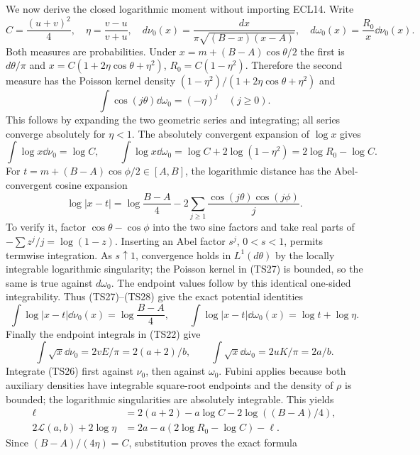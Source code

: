 We now derive the closed logarithmic moment without importing ECL14.
Write
\[
 C=\frac{(u+v)^2}{4},\quad\eta=\frac{v-u}{v+u},\quad
 d\nu_0(x)=\frac{dx}{\pi\sqrt{(B-x)(x-A)}},\quad
 d\omega_0(x)=\frac{R_0}{x}\dd\nu_0(x).
\]
Both measures are probabilities. Under $x=m+(B-A)\cos\theta/2$
the first is $d\theta/\pi$ and
$x=C(1+2\eta\cos\theta+\eta^2)$,
$R_0=C(1-\eta^2)$. Therefore the second measure has the Poisson
kernel density $(1-\eta^2)/(1+2\eta\cos\theta+\eta^2)$ and
\begin{equation}\tag{TS27}
 \int\cos(j\theta)\dd\omega_0=(-\eta)^j\quad(j\geq0).
\end{equation}
This follows by expanding the two geometric series and integrating;
all series converge absolutely for $\eta<1$.
The absolutely convergent expansion of $\log x$ gives
\begin{equation}\tag{TS28}
 \int\log x\dd\nu_0=\log C,\qquad
 \int\log x\dd\omega_0=\log C+2\log(1-\eta^2)
 =2\log R_0-\log C.
\end{equation}
For $t=m+(B-A)\cos\phi/2\in[A,B]$, the logarithmic distance has
the Abel-convergent cosine expansion
\[
 \log|x-t|=\log\frac{B-A}{4}
       -2\sum_{j\geq1}\frac{\cos(j\theta)\cos(j\phi)}j.
\]
To verify it, factor $\cos\theta-\cos\phi$ into the two sine
factors and take real parts of $-\sum z^j/j=\log(1-z)$.
Inserting an Abel factor $s^j$, $0<s<1$, permits termwise
integration. As $s\uparrow1$, convergence holds in $L^1(d\theta)$
by the locally integrable logarithmic singularity; the Poisson
kernel in (TS27) is bounded, so the same is true against $d\omega_0$.
The endpoint values follow by this identical one-sided integrability.
Thus (TS27)--(TS28) give the exact potential identities
\begin{equation}\tag{TS29}
 \int\log|x-t|\dd\nu_0(x)=\log\frac{B-A}{4},\qquad
 \int\log|x-t|\dd\omega_0(x)=\log t+\log\eta.
\end{equation}
Finally the endpoint integrals in (TS22) give
\[
 \int\sqrt x\dd\nu_0=2vE/\pi=2(a+2)/b,\qquad
 \int\sqrt x\dd\omega_0=2uK/\pi=2a/b.
\]
Integrate (TS26) first against $\nu_0$, then against $\omega_0$.
Fubini applies because both auxiliary densities have integrable
square-root endpoints and the density of $\rho$ is bounded;
the logarithmic singularities are absolutely integrable. This yields
\begin{align*}
 \ell&=2(a+2)-a\log C-2\log((B-A)/4),\\
 2\mathcal L(a,b)+2\log\eta
 &=2a-a(2\log R_0-\log C)-\ell.
\end{align*}
Since $(B-A)/(4\eta)=C$, substitution proves the exact formula
